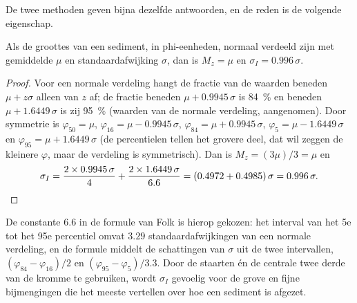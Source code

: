 De twee methoden geven bijna dezelfde antwoorden, en de reden is de volgende eigenschap.

\begin{proposition}\label{prop:b1:clastic-sediments:normal}
Als de groottes van een sediment, in phi-eenheden, normaal verdeeld zijn met gemiddelde $\mu$ en standaardafwijking $\sigma$, dan is $M_z = \mu$ en $\sigma_I = 0.996\,\sigma$.
\end{proposition}

\begin{proof}
Voor een normale verdeling hangt de fractie van de waarden beneden $\mu + z\sigma$ alleen van $z$ af; de fractie beneden $\mu + 0.9945\,\sigma$ is \qty{84}{\percent} en beneden $\mu + 1.6449\,\sigma$ is zij \qty{95}{\percent} (waarden van de normale verdeling, aangenomen). Door symmetrie is $\varphi_{50} = \mu$, $\varphi_{16} = \mu -
0.9945\,\sigma$, $\varphi_{84} = \mu + 0.9945\,\sigma$, $\varphi_5 = \mu -
1.6449\,\sigma$ en $\varphi_{95} = \mu + 1.6449\,\sigma$ (de percentielen tellen het grovere deel, dat wil zeggen de kleinere $\varphi$, maar de verdeling is symmetrisch). Dan is $M_z = (3\mu)/3 = \mu$ en
\[
  \sigma_I = \frac{2 \times 0.9945\,\sigma}{4} + \frac{2 \times 1.6449\,\sigma}{6.6}
  = (0.4972 + 0.4985)\,\sigma = 0.996\,\sigma. \qedhere
\]
\end{proof}

De constante 6.6 in de formule van Folk is hierop gekozen: het interval van het 5e tot het 95e percentiel omvat $3.29$ standaardafwijkingen van een normale verdeling, en de formule middelt de schattingen van $\sigma$ uit de twee intervallen, $(\varphi_{84}-\varphi_{16})/2$ en $(\varphi_{95}-\varphi_5)/3.3$. Door de staarten én de centrale twee derde van de kromme te gebruiken, wordt $\sigma_I$ gevoelig voor de grove en fijne bijmengingen die het meeste vertellen over hoe een sediment is afgezet.

